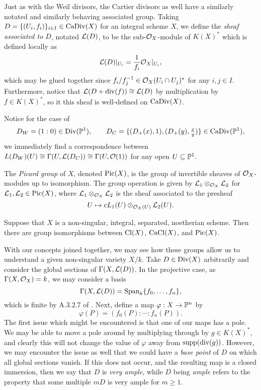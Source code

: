 Just as with the Weil divisors,
the Cartier divisors as well have a similarly notated and similarly behaving associated group.
Taking $D = \{(U_i, f_i)\}_{i \in I} \in {\rm CaDiv}(X)$ for an integral scheme $X$,
we define the \textit{sheaf associated to $D$}, notated $\mathcal{L}(D)$,
to be the sub-$\mathcal{O}_X$-module of $K(X)^*$ which is defined locally as
\[
    \mathcal{L}(D)|_{U_i} = \frac{1}{f_i} \mathcal{O}_X|_{U_i},
\]
which may be glued together since $f_i/f_j^{-1} \in \mathcal{O}_X(U_i \cap U_j)^*$ for any $i, j \in I$.
Furthermore, notice that $\mathcal{L}(D + {\rm div}(f)) \cong \mathcal{L}(D)$ by multiplication by $f \in K(X)^*$,
so it this sheaf is well-defined on ${\rm CaDiv}(X)$. 

Notice for the case of
\[
    D_W = (1 : 0) \in {\rm Div}(\mathbb{P}^1), \qquad 
    D_C = \{(D_+(x), 1), (D_+(y), \tfrac{x}{y})\} \in {\rm CaDiv}(\mathbb{P}^1),
\]
we immediately find a correspondence between $L(D_W)(U) \cong \Gamma(U, \mathcal{L}(D_C)) \cong \Gamma(U, \mathcal{O}(1))$ for any open $U \subseteq \mathbb{P}^1$.

\begin{definition}
    The \textit{Picard group} of $X$, denoted ${\rm Pic}(X)$,
    is the group of invertible sheaves of $\mathcal{O}_X$-modules up to isomorphism.
    The group operation is given by $\mathcal{L}_1 \otimes_{\mathcal{O}_X} \mathcal{L}_2$ for $\mathcal{L}_1, \mathcal{L}_2 \in {\rm Pic}(X)$,
    where $\mathcal{L}_1 \otimes_{\mathcal{O}_X} \mathcal{L}_2$ is the sheaf associated to the presheaf
    \[
        U \mapsto cL_1(U) \otimes_{\mathcal{O}_X(U)} \mathcal{L}_2(U).
    \]
\end{definition}

\begin{theorem}
    Suppose that $X$ is a non-singular, integral, separated, noetherian scheme.
    Then there are group isomorphisms between ${\rm Cl}(X)$, ${\rm CaCl}(X)$, and ${\rm Pic}(X)$.
\end{theorem}

With our concepts joined together,
we may see how these groups allow us to understand a given non-singular variety $X/k$.
Take $D \in {\rm Div}(X)$ arbitrarily and consider the global sections of $\Gamma(X, \mathcal{L}(D))$.
In the projective case, as $\Gamma(X, \mathcal{O}_X) = k$,
we may consider a basis
\[
    \Gamma(X, \mathcal{L}(D)) = {\rm Span}_k \{f_0, \ldots, f_n\},
\]
which is finite by A.3.2.7 of \cite{Silverman_Hindry_2013}.
Next, define a map $\varphi : X \to \mathbb{P}^n$ by
\[
    \varphi(P) = (f_0(P): \cdots : f_n(P)).
\]
The first issue which might be encountered is that one of our maps has a pole.
We may be able to move a pole around by multiplying through by $g \in K(X)^*$,
and clearly this will not change the value of $\varphi$ away from ${\rm supp}({\rm div}(g))$.
However, we may encounter the issue as well that we could have a \textit{base point} of $D$ on which all global sections vanish.
If this does not occur, and the resulting map is a closed immersion,
then we say that $D$ is \textit{very ample},
while $D$ being \textit{ample} refers to the property that some multiple $mD$ is very ample for $m \geq 1$.

